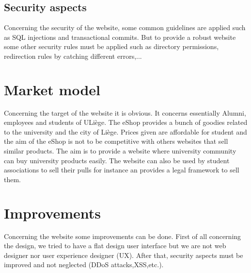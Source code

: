 \documentclass{article}
\begin{document}
\subsection{Security aspects}
Concerning the security of the website, some common guidelines are applied such as SQL injections and transactional commits. But to provide a robust website some other security rules must be applied such as directory permissions, redirection rules by catching different errors,...

\section{Market model}
Concerning the target of the website it is obvious. It concerns essentially Alumni, employees and students of ULiège. The eShop provides a bunch of goodies related to the university and the city of Liège. Prices given are affordable for student and the aim of the eShop is not to be competitive with others websites that sell similar products. The aim is to provide a website where university community can buy university products easily. The website can also be used by student associations to sell their pulls for instance an provides a legal framework to sell them.

\section{Improvements}
Concerning the website some improvements can be done. First of all concerning the design, we tried to have a flat design user interface but we are not web designer nor user experience designer (UX). After that, security aspects must be improved and not neglected (DDoS attacks,XSS,etc.).
\end{document}
